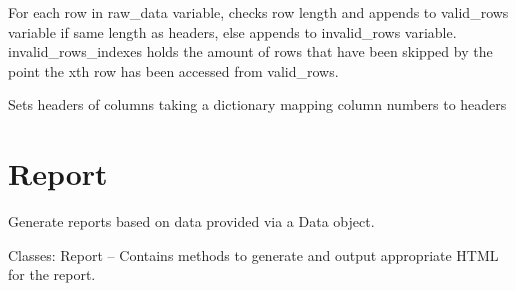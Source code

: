 \documentclass[letterpaper,10pt,english]{sphinxmanual}
\begin{document}
\begin{fulllineitems}
\begin{fulllineitems}
\begin{description}
\end{description}

\end{fulllineitems}


\begin{fulllineitems}
\label{Code_rst/dat:data.Data.remove_invalid}
For each row in raw\_data variable, checks row length and appends to 
valid\_rows variable if same length as headers, else appends to 
invalid\_rows variable. invalid\_rows\_indexes holds the amount of rows that have been
skipped by the point the xth row has been accessed from valid\_rows.

\end{fulllineitems}


\begin{fulllineitems}
\label{Code_rst/dat:data.Data.set_headers}
Sets headers of columns taking a dictionary 
mapping column numbers to headers

\end{fulllineitems}


\end{fulllineitems}



\section{Report}
\label{Code_rst/rep:report}\label{Code_rst/rep::doc}\label{Code_rst/rep:module-report}
Generate reports based on data provided via a Data object.

Classes:
Report -- Contains methods to generate and output appropriate HTML for the report.
\end{document}
